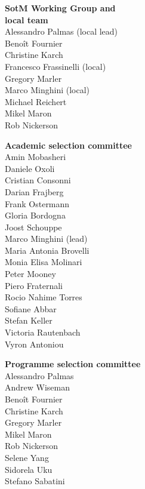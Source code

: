 \begin{multicols}{2}
  \begin{small}
    \textbf{SotM Working Group and\\ local team}\\
    Alessandro Palmas (local lead)\\
    Benoît Fournier\\
    Christine Karch\\
    Francesco Frassinelli (local)\\
    Gregory Marler\\
    Marco Minghini (local)\\
    Michael Reichert\\
    Mikel Maron\\
    Rob Nickerson

    \vspace{\volunteerSpace}
    \textbf{Academic selection committee}\\
    Amin Mobasheri\\
    Daniele Oxoli\\
    Cristian Consonni\\
    Darian Frajberg\\
    Frank Ostermann\\
    Gloria Bordogna\\
    Joost Schouppe\\
    Marco Minghini (lead)\\
    Maria Antonia Brovelli\\
    Monia Elisa Molinari\\
    Peter Mooney\\
    Piero Fraternali\\
    Rocio Nahime Torres\\
    Sofiane Abbar\\
    Stefan Keller\\
    Victoria Rautenbach\\
    Vyron Antoniou

    \vspace{\volunteerSpace}
    \textbf{Programme selection \mbox{committee}}\\
    Alessandro Palmas\\
    Andrew Wiseman\\
    Benoît Fournier\\
    Christine Karch\\
    Gregory Marler\\
    Mikel Maron\\
    Rob Nickerson\\
    Selene Yang\\
    Sidorela Uku\\
    Stefano Sabatini\\


\end{small}
\end{multicols}
